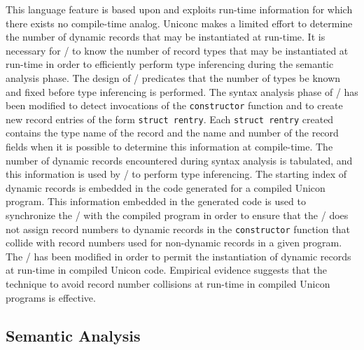 This language feature is based upon and exploits \mbox{run-time}
information for which there exists no \mbox{compile-time}
analog. Uniconc makes a limited effort to determine the number of
dynamic records that may be instantiated at \mbox{run-time}. It is
necessary for \Ic/ to know the number of record types that may be
instantiated at \mbox{run-time} in order to efficiently perform type
inferencing during the semantic analysis phase. The design of \Ic/
predicates that the number of types be known and fixed before type
inferencing is performed. The syntax analysis phase of \Ic/ has been
modified to detect invocations of the \texttt{constructor} function
and to create new record entries of the form \texttt{struct
rentry}. Each \texttt{struct rentry} created contains the type name of
the record and the name and number of the record fields when it is
possible to determine this information at \mbox{compile-time}. The
number of dynamic records encountered during syntax analysis is
tabulated, and this information is used by \Ic/ to perform type
inferencing. The starting index of dynamic records is embedded in the
code generated for a compiled Unicon program. This information
embedded in the generated code is used to synchronize the \Rtl/ with
the compiled program in order to ensure that the \Rtl/ does not assign
record numbers to dynamic records in the \texttt{constructor} function
that collide with record numbers used for non-dynamic records in a
given program. The \Rtl/ has been modified in order to permit the
instantiation of dynamic records at \mbox{run-time} in compiled Unicon
code.  Empirical evidence suggests that the technique to avoid record
number collisions at \mbox{run-time} in compiled Unicon programs is
effective.

\subsection{Semantic Analysis}

